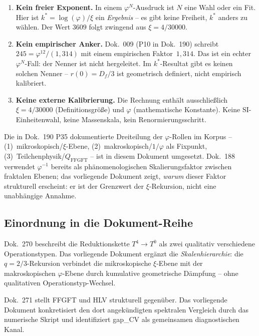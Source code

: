 \begin{enumerate}
  \item \textbf{Kein freier Exponent.} In einem $\varphi^N$-Ausdruck ist
        $N$ eine Wahl oder ein Fit. Hier ist $k^* = \log(\varphi)/\xi$ ein
        \emph{Ergebnis} -- es gibt keine Freiheit, $k^*$ anders zu wählen.
        Der Wert $3609$ folgt zwingend aus $\xi = 4/30000$.

  \item \textbf{Kein empirischer Anker.} Dok.~009 (P10 in Dok.~190) schreibt
        $245 = \varphi^{12}/(1{,}314)$ mit einem empirischen Faktor~$1{,}314$.
        Das ist ein echter $\varphi^N$-Fall: der Nenner ist nicht hergeleitet.
        Im $k^*$-Resultat gibt es keinen solchen Nenner -- $r(0) = D_f/3$
        ist geometrisch definiert, nicht empirisch kalibriert.

  \item \textbf{Keine externe Kalibrierung.} Die Rechnung enthält ausschließlich
        $\xi = 4/30000$ (Definitionsgröße) und $\varphi$ (mathematische
        Konstante). Keine SI-Einheitenwahl, keine Massenskala, kein
        Renormierungsschritt.
\end{enumerate}

Die in Dok.~190 P35 dokumentierte Dreiteilung der $\varphi$-Rollen im
Korpus -- (1)~mikroskopisch/$\xi$-Ebene, (2)~makroskopisch/$1/\varphi$
als Fixpunkt, (3)~Teilchenphysik/$Q_\mathrm{FFGFT}$ -- ist in diesem
Dokument umgesetzt. Dok.~188 verwendet $\varphi^{-1}$ bereits als
phänomenologischen Skalierungsfaktor zwischen fraktalen Ebenen; das
vorliegende Dokument zeigt, \emph{warum} dieser Faktor strukturell
erscheint: er ist der Grenzwert der $\xi$-Rekursion, nicht eine
unabhängige Annahme.

\subsection{Einordnung in die Dokument-Reihe}

Dok.~270 beschreibt die Reduktionskette $T^4\to T^0$ als zwei qualitativ
verschiedene Operationstypen. Das vorliegende Dokument ergänzt die
\emph{Skalenhierarchie}: die $q=2/3$-Rekursion verbindet die mikroskopische
$\xi$-Ebene mit der makroskopischen $\varphi$-Ebene durch kumulative
geometrische Dämpfung -- ohne qualitativen Operationstyp-Wechsel.

Dok.~271 stellt FFGFT und HLV strukturell gegenüber. Das vorliegende
Dokument konkretisiert den dort angekündigten spektralen Vergleich durch
das numerische Skript und identifiziert gap\_CV als gemeinsamen
diagnostischen Kanal.

